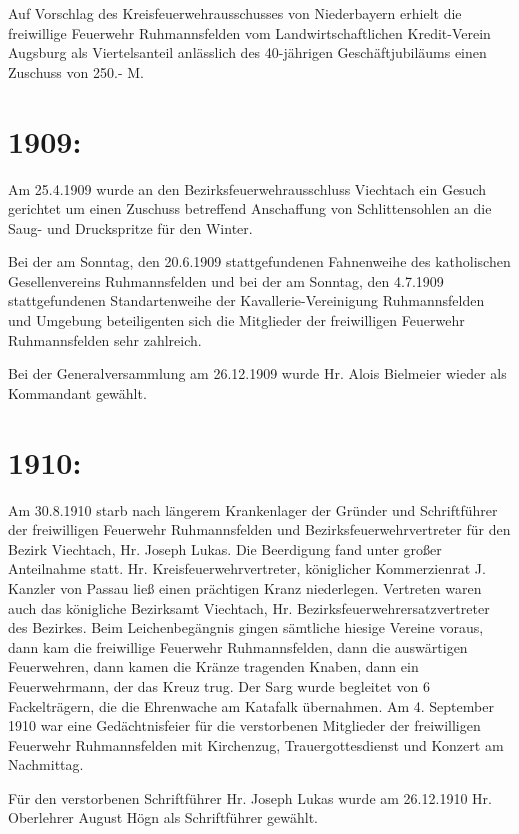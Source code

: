 \documentclass[12pt,a4paper]{book}
\begin{document}
Auf Vorschlag des Kreisfeuerwehrausschusses von Niederbayern erhielt die
freiwillige Feuerwehr Ruhmannsfelden vom Landwirtschaftlichen Kredit-Verein
Augsburg als Viertelsanteil anlässlich des 40-jährigen Geschäftjubiläums einen
Zuschuss von 250.- M.

\section{1909:}

Am 25.4.1909 wurde an den Bezirksfeuerwehrausschluss Viechtach ein Gesuch
gerichtet um einen Zuschuss betreffend Anschaffung von Schlittensohlen an die
Saug- und Druckspritze für den Winter.

Bei der am Sonntag, den 20.6.1909 stattgefundenen Fahnenweihe des katholischen
Gesellenvereins Ruhmannsfelden und bei der am Sonntag, den 4.7.1909
stattgefundenen Standartenweihe der Kavallerie-Vereinigung Ruhmannsfelden und
Umgebung beteiligenten sich die Mitglieder der freiwilligen Feuerwehr
Ruhmannsfelden sehr zahlreich.

Bei der Generalversammlung am 26.12.1909 wurde Hr. Alois Bielmeier wieder als
Kommandant gewählt.

\section{1910:}

Am 30.8.1910 starb nach längerem Krankenlager der Gründer und Schriftführer der
freiwilligen Feuerwehr Ruhmannsfelden und Bezirksfeuerwehrvertreter für den
Bezirk Viechtach, Hr. Joseph Lukas. Die Beerdigung fand unter großer Anteilnahme
statt. Hr. Kreisfeuerwehrvertreter, königlicher Kommerzienrat J. Kanzler von
Passau ließ einen prächtigen Kranz niederlegen. Vertreten waren auch das
königliche Bezirksamt Viechtach, Hr. Bezirksfeuerwehrersatzvertreter des
Bezirkes. Beim Leichenbegängnis gingen sämtliche hiesige Vereine voraus, dann
kam die freiwillige Feuerwehr Ruhmannsfelden, dann die auswärtigen Feuerwehren,
dann kamen die Kränze tragenden Knaben, dann ein Feuerwehrmann, der das Kreuz
trug. Der Sarg wurde begleitet von 6 Fackelträgern, die die Ehrenwache am
Katafalk übernahmen. Am 4. September 1910 war eine Gedächtnisfeier für die
verstorbenen Mitglieder der freiwilligen Feuerwehr Ruhmannsfelden mit
Kirchenzug, Trauergottesdienst und Konzert am Nachmittag.

Für den verstorbenen Schriftführer Hr. Joseph Lukas wurde am 26.12.1910 Hr.
Oberlehrer August Högn als Schriftführer gewählt.
\end{document}
